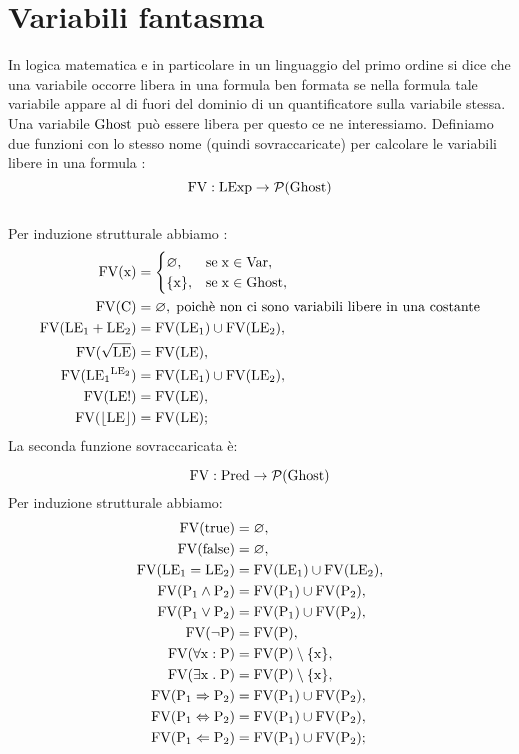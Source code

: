 \documentclass[a4paper, 12pt, oneside,fleqn]{book}
\begin{document}
\section{Variabili fantasma}
In logica matematica e in particolare in un linguaggio del primo ordine si dice che una variabile occorre libera in una formula ben formata se nella formula tale variabile appare al di fuori del dominio di un quantificatore sulla variabile stessa. Una variabile $\mathrm{Ghost}$ può essere libera per questo ce ne interessiamo.
Definiamo due funzioni con lo stesso nome (quindi sovraccaricate) per calcolare le variabili libere in una formula :
$$\mathrm{FV}\mathrel{:}\mathrm{LExp} \rightarrow \mathcal{P}(\mathrm{Ghost})$$\\
Per induzione strutturale abbiamo :
\begin{align}
\mathrm{FV}(\mathrm{x}) &= \begin{cases}
   \varnothing,&\text{se}\hspace{1mm} \mathrm{x} \in \mathrm{Var}, \\
   \{\mathrm{x}\},&\text{se}\hspace{1mm}\mathrm{x} \in \mathrm{Ghost},
   \end{cases} \\
\mathrm{FV}(\mathrm{C}) &= \varnothing,\hspace{1mm} \text{poichè non ci sono variabili libere in una costante}\\
\mathrm{FV}(\mathrm{LE}{_1} + \mathrm{LE}{_2}) &= \mathrm{FV}(\mathrm{LE}{_1}) \cup \mathrm{FV}(\mathrm{LE}{_2}),\\
\mathrm{FV}(\sqrt{\mathrm{LE}}) &= \mathrm{FV}(\mathrm{LE}),\\
\mathrm{FV}(\mathrm{LE}{_1}^{\mathrm{LE}_2}) &= \mathrm{FV}(\mathrm{LE}{_1}) \cup \mathrm{FV}(\mathrm{LE}_2),\\
\mathrm{FV}(\mathrm{LE}!) &= \mathrm{FV}(\mathrm{LE}),\\
\mathrm{FV}(\lfloor \mathrm{LE} \rfloor) &= \mathrm{FV}(\mathrm{LE});
\end{align}
La seconda funzione sovraccaricata è:

$$\mathrm{FV}\mathrel{:}\mathrm{Pred}\rightarrow\mathcal{P}(\mathrm{Ghost})$$
Per induzione strutturale abbiamo:
\begin{align}
\mathrm{FV}(\mathrm{true}) &= \varnothing,\\
\mathrm{FV}(\mathrm{false}) &= \varnothing,\\
\mathrm{FV}(\mathrm{LE}{_1} = \mathrm{LE}{_2}) &= \mathrm{FV}(\mathrm{LE}{_1}) \cup \mathrm{FV}(\mathrm{LE}{_2}),\\
\mathrm{FV}(\mathrm{P}{_1} \wedge \mathrm{P}{_2}) &= \mathrm{FV}(\mathrm{P}{_1}) \cup \mathrm{FV}(\mathrm{P}{_2}),\\
\mathrm{FV}(\mathrm{P}{_1} \vee \mathrm{P}{_2}) &= \mathrm{FV}(\mathrm{P}{_1}) \cup \mathrm{FV}(\mathrm{P}{_2}),\\
\mathrm{FV}(\neg \mathrm{P}) &= \mathrm{FV}(\mathrm{P}),\\
\mathrm{FV}(\forall\mathrm{x}\mathrel{:} \mathrm{P}) &= \mathrm{FV}(\mathrm{P})\setminus \{\mathrm{x}\},\\
\mathrm{FV}(\exists\mathrm{x}\mathrel{.} \mathrm{P}) &= \mathrm{FV}(\mathrm{P})\setminus \{\mathrm{x}\},\\
\mathrm{FV}(\mathrm{P}{_1} \Rightarrow \mathrm{P}{_2}) &= \mathrm{FV}(\mathrm{P}{_1}) \cup \mathrm{FV}(\mathrm{P}{_2}),\\
\mathrm{FV}(\mathrm{P}{_1} \Leftrightarrow \mathrm{P}{_2}) &= \mathrm{FV}(\mathrm{P}{_1}) \cup \mathrm{FV}(\mathrm{P}{_2}),\\
\mathrm{FV}(\mathrm{P}{_1} \Leftarrow \mathrm{P}{_2}) &= \mathrm{FV}(\mathrm{P}{_1}) \cup \mathrm{FV}(\mathrm{P}{_2});
\end{align}
\end{document}
